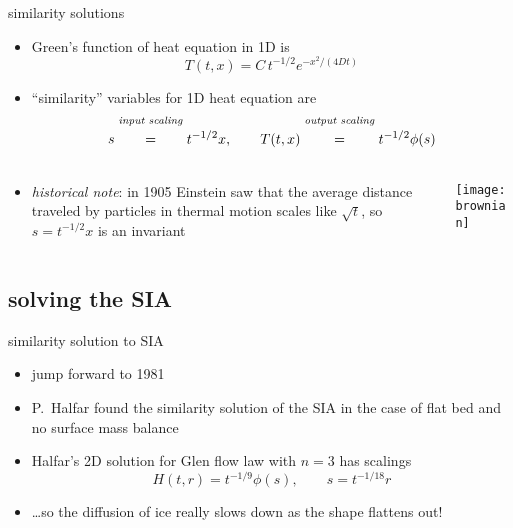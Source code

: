 \begin{frame}{similarity solutions}

\begin{itemize}
\item Green's function of heat equation in 1D is
	$$T(t,x) = C\, t^{-1/2} e^{-x^2/(4Dt)}$$
\item ``similarity'' variables for 1D heat equation are
	$$s \stackrel{\text{\emph{input scaling}}}{\phantom{\Big|}=\phantom{\Big|}} t^{-1/2} x, \qquad T(t,x) \stackrel{\text{\emph{output scaling}}}{\phantom{\Big|}=\phantom{\Big|}} t^{-1/2} \phi(s)$$
\end{itemize}
\begin{columns}
\begin{column}{0.6\textwidth}
\begin{itemize}
\item \emph{historical note}:  in 1905 Einstein saw that the average distance traveled by particles in thermal motion scales like $\sqrt{t}$, so $s = t^{-1/2}x$ is an invariant
\end{itemize}
\end{column}
\begin{column}{0.4\textwidth}
\begin{center}
\texttt{[image: brownian]}
\end{center}
\end{column}
\end{columns}

\end{frame}


\subsection{solving the SIA}

\begin{frame}{similarity solution to SIA}

\begin{itemize}
\item jump forward to 1981
\item P.~Halfar found the similarity solution of the SIA in the case of flat bed and no surface mass balance \nocite{Halfar81,Halfar83}
\item Halfar's 2D solution for Glen flow law with $n=3$ has scalings
   $$H(t,r)=t^{-1/9} \phi(s), \qquad s = t^{-1/18} r$$
\item \dots so the diffusion of ice really slows down as the shape flattens out!
\end{itemize}
\end{frame}


